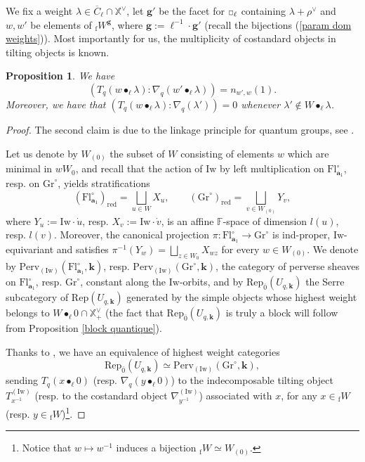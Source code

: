 \documentclass[11pt]{amsart}
\theoremstyle{plain}
\newtheorem{prop}[thm]{Proposition}
\theoremstyle{remark}
\newcommand{\car}{\mbox{\relsize{-5}$\Box$}}
\numberwithin{equation}{section}
\begin{document}
	We fix a weight $\lambda\in\overline{C}_\ell\cap\mathbb{X}^\vee$, let $\mathbf{g}'$ be the facet for $\car_\ell$ containing $\lambda+\rho^\vee$ and $w,w'$ be elements of ${_\mathrm{f}W}^{\mathbf{g}}$, where $\mathbf{g}:=\ell^{-1}\cdot\mathbf{g}'$ (recall the bijections (\ref{param dom weights})). Most importantly for us, the multiplicity of costandard objects in tilting objects is known.
	\begin{prop}\label{character quantiq}
	We have
	$$(T_q(w\bullet_\ell\lambda):\nabla_q(w'\bullet_\ell\lambda))=n_{w',w}(1). $$
	Moreover, we have that $(T_q(w\bullet_\ell\lambda):\nabla_q(\lambda'))=0$ whenever $\lambda'\notin W\bullet_\ell\lambda$.
	\end{prop}
	\begin{proof}
	 The second claim is due to the linkage principle for quantum groups, see \cite[§8]{andersen1991representations}.
	 
	Let us denote by $W_{(0)}$ the subset of $W$ consisting of elements $w$ which are minimal in $wW_0$, and recall that the action of $\mathrm{Iw}$ by left multiplication on $\mathrm{Fl}_{\mathbf{a}_1}^\circ$, resp. on $\mathrm{Gr}^\circ$, yields stratifications 
	$$(\mathrm{Fl}_{\mathbf{a}_1}^\circ)_{\mathrm{red}}=\bigsqcup_{u\in W}X_u,\qquad(\mathrm{Gr}^\circ)_{\mathrm{red}}=\bigsqcup_{v\in W_{(0)}}Y_v, $$
	where $Y_u:=\mathrm{Iw}\cdot\dot{u}$, resp. $X_v:=\mathrm{Iw}\cdot\dot{v}$, is an affine $\mathbb{F}$-space of dimension $l(u)$, resp. $l(v)$. Moreover, the canonical projection $\pi:\mathrm{Fl}_{\mathbf{a}_1}^\circ\to \mathrm{Gr}^\circ$ is ind-proper, $\mathrm{Iw}$-equivariant and satisfies $\pi^{-1}(Y_w)=\bigsqcup_{z\in W_0}X_{wz}$ for every $w\in W_{(0)}$. We denote by $\mathrm{Perv}_{(\mathrm{Iw})}(\mathrm{Fl}_{\mathbf{a}_1}^\circ,\mathbf{k})$, resp. $\mathrm{Perv}_{(\mathrm{Iw})}(\mathrm{Gr}^\circ,\mathbf{k})$, the category of perverse sheaves on $\mathrm{Fl}_{\mathbf{a}_1}^\circ$, resp. $\mathrm{Gr}^\circ$, constant along the $\mathrm{Iw}$-orbits, and by $\mathrm{Rep}_{\overline{0}}(U_{q,\mathbf{k}})$ the Serre subcategory of $\mathrm{Rep}(U_{q,\mathbf{k}})$ generated by the simple objects whose highest weight belongs to $W\bullet_\ell0\cap\mathbb{X}^\vee_{+}$ (the fact that $\mathrm{Rep}_{\overline{0}}(U_{q,\mathbf{k}})$ is truly a block will follow from Proposition \ref{block quantique}). 
	
	Thanks to \cite{arkhipov2004quantum}, we have an equivalence of highest weight categories 
	$$\mathrm{Rep}_{\overline{0}}(U_{q,\mathbf{k}})\simeq \mathrm{Perv}_{(\mathrm{Iw})}(\mathrm{Gr}^\circ,\mathbf{k}),$$
	sending $T_q(x\bullet_\ell 0)$ (resp. $\nabla_q(y\bullet_\ell0)$) to the indecomposable tilting object $T^{(\mathrm{Iw})}_{x^{-1}}$ (resp. to the costandard object $\nabla^{(\mathrm{Iw})}_{y^{-1}}$) associated with $x$, for any $x\in{_\mathrm{f}W}$ (resp. $y\in{_\mathrm{f}W}$)\footnote{Notice that $w\mapsto w^{-1}$ induces a bijection ${_\mathrm{f}W}\simeq W_{(0)}$.}. 
	

\end{proof}
\end{document}
